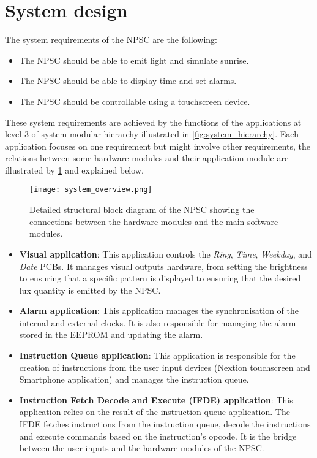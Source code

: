 \section{System design}
The system requirements of the NPSC are the following:
\begin{itemize}
\item The NPSC should be able to emit light and simulate sunrise. 
\item The NPSC should be able to display time and set alarms.
\item The NPSC should be controllable using a touchscreen device.
\end{itemize}
These system requirements are achieved by the functions of the applications at level 3 of system modular hierarchy illustrated in \cref{fig:system_hierarchy}. Each application focuses on one requirement but might involve other requirements, the relations between some hardware modules and their application module are illustrated by \cref{fig:system_overview} and explained below.
\begin{figure}[ht]
\centering
\texttt{[image: system\_overview.png]}
\caption{Detailed structural block diagram of the NPSC showing the connections between the hardware modules and the main software modules.}
\label{fig:system_overview}
\end{figure}
\begin{itemize}
\item \textbf{Visual application}: This application controls the \textit{Ring}, \textit{Time}, \textit{Weekday}, and \textit{Date} PCBs. It manages visual outputs hardware, from setting the brightness to ensuring that a specific pattern is displayed to ensuring that the desired lux quantity is emitted by the NPSC.
\item \textbf{Alarm application}: This application manages the synchronisation of the internal and external clocks. It is also responsible for managing the alarm stored in the EEPROM and updating the alarm.
\item \textbf{Instruction Queue application}: This application is responsible for the creation of instructions from the user input devices (Nextion touchscreen and Smartphone application) and manages the instruction queue.
\item \textbf{Instruction Fetch Decode and Execute (IFDE) application}: This application relies on the result of the instruction queue application. The IFDE fetches instructions from the instruction queue, decode the instructions and execute commands based on the instruction's opcode. It is the bridge between the user inputs and the hardware modules of the NPSC.
\end{itemize}

